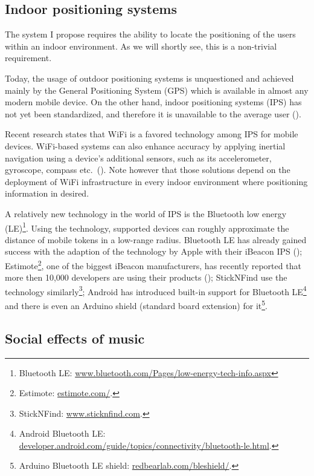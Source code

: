 \documentclass[a4paper,11pt]{article}
\begin{document}
\subsection{Indoor positioning systems} \label{literature:ips}

The system I propose requires the ability to locate the positioning of the users within an indoor environment.
As we will shortly see, this is a non-trivial requirement.

Today, the usage of outdoor positioning systems is unquestioned and achieved mainly by the General Positioning System (GPS) which is available in almost any modern mobile device.
On the other hand, indoor positioning systems (IPS) has not yet been standardized, and therefore it is unavailable to the average user (\cite{web:turetsky}).

Recent research states that WiFi is a favored technology among IPS for mobile devices.
WiFi-based systems can also enhance accuracy by applying inertial navigation using a device's additional sensors, such as its accelerometer, gyroscope, compass etc.\ (\cite{web:harrop}).
Note however that those solutions depend on the deployment of WiFi infrastructure in every indoor environment where positioning information in desired.

A relatively new technology in the world of IPS is the Bluetooth low energy (LE)\footnote{Bluetooth LE: \href{http://www.bluetooth.com/Pages/low-energy-tech-info.aspx}{www.bluetooth.com/Pages/low-energy-tech-info.aspx}}.
Using the technology, supported devices can roughly approximate the distance of mobile tokens in a low-range radius.
Bluetooth LE has already gained success with the adaption of the technology by Apple with their iBeacon IPS (\cite{web:danova});
Estimote\footnote{Estimote: \href{http://estimote.com/}{estimote.com/}.}, one of the biggest iBeacon manufacturers, has recently reported that more then 10,000 developers are using their products (\cite{web:thompson});
StickNFind use the technology similarly\footnote{StickNFind: \href{https://www.sticknfind.com}{www.sticknfind.com}.};
Android has introduced built-in support for Bluetooth LE\footnote{Android Bluetooth LE: \href{http://developer.android.com/guide/topics/connectivity/bluetooth-le.html}{developer.android.com/guide/topics/connectivity/bluetooth-le.html}.} and there is even an Arduino shield (standard board extension) for it\footnote{Arduino Bluetooth LE shield: \href{http://redbearlab.com/bleshield/}{redbearlab.com/bleshield/}.}.

\subsection{Social effects of music} \label{literature:social_effects}
\end{document}
